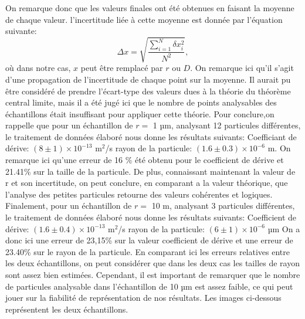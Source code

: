 \documentclass[11pt,letterpaper]{article}
\begin{document}
On remarque donc que les valeurs finales ont été obtenues en faisant la moyenne de chaque valeur. l'incertitude liée à cette moyenne est donnée
par l'équation suivante: 
\[
  \Delta x = \sqrt{\frac{\sum_{i=1}^N \delta x_{i}^2}{N^2}},
\]
où dans notre cas, $x$ peut être remplacé par $r$ ou $D$. On remarque ici qu'il s'agit d'une propagation de l’incertitude de chaque point sur la 
moyenne. Il aurait pu être considéré de prendre l'écart-type des valeurs dues à la théorie du théorème central limite, mais il a été jugé ici que le nombre de points 
analysables des échantillons était insuffisant pour appliquer cette théorie. 
Pour conclure,on rappelle que pour un échantillon de $r =$ 1 µm, analysant 12 particules différentes, 
le traitement de données élaboré nous donne les résultats suivants: 
Coefficiant de dérive: $(8 \pm 1) \times 10^{-13}$ m$^{2}$/s
rayon de la particule: $(1.6 \pm 0.3)\times 10^{-6}$ m.
On remarque ici qu'une erreur de 16 \% été obtenu pour le coefficient de dérive et 21.41\% sur la taille de la particule.
De plus, connaissant maintenant la valeur de r et son incertitude, on peut conclure, en comparant a la valeur théorique, que l'analyse 
des petites particules retourne des valeurs cohérentes et logiques. 
Finalement, pour un échantillon de $r =$ 10 m, analysant 3 particules différentes, 
le traitement de données élaboré nous donne les résultats suivants: 
Coefficient de dérive: $(1.6 \pm 0.4) \times 10^{-13}$ m$^{2}$/s
rayon de la particule: $(6 \pm 1)\times 10^{-6}$ µm
On a donc ici une erreur de 23,15\% sur la valeur coefficient de dérive et une erreur de 23.40\% sur le rayon de la particule. 
En comparant ici les erreurs relatives entre les deux échantillons, on peut considérer que dans les deux cas les tailles de rayon sont assez bien estimées. Cependant, il est important de remarquer que le nombre de particules analysable dans l'échantillon de 10 µm est assez faible, ce qui 
peut jouer sur la fiabilité de représentation de nos résultats. Les images ci-dessous représentent les deux échantillons. 
\end{document}
